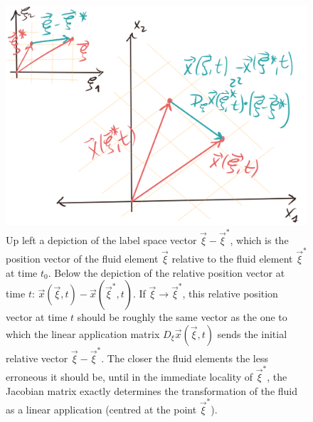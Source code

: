 \documentclass[11pt, a4paper]{article} %
\begin{document}
\begin{figure}[h!]
  \centering
    \includegraphics[width=0.57\linewidth]{2Jacob_as_lin_app.png}
  \caption{Up left a depiction of the label space vector $\vec{\xi}-\vec{\xi}^*$, which is the position vector of the fluid element $\vec{\xi}$ relative to the fluid element $\vec{\xi}^*$ at time $t_0$. Below the depiction of the relative position vector at time $t$: $\vec{x}(\vec{\xi},t)-\vec{x}(\vec{\xi}^*,t)$. If $\vec{\xi}\rightarrow \vec{\xi}^*$, this relative position vector at time $t$ should be roughly the same vector as the one to which the linear application matrix $D_\xi \vec{x}(\vec{\xi},t)$ sends the initial relative vector $\vec{\xi}-\vec{\xi}^*$. The closer the fluid elements the less erroneous it should be, until in the immediate locality of $\vec{\xi}^*$, the Jacobian matrix exactly determines the transformation of the fluid as a linear application (centred at the point $\vec{\xi}^*$). \vspace{-0.1cm} }
  \label{fig:JacobMatrix}
\end{figure}
\end{document}
